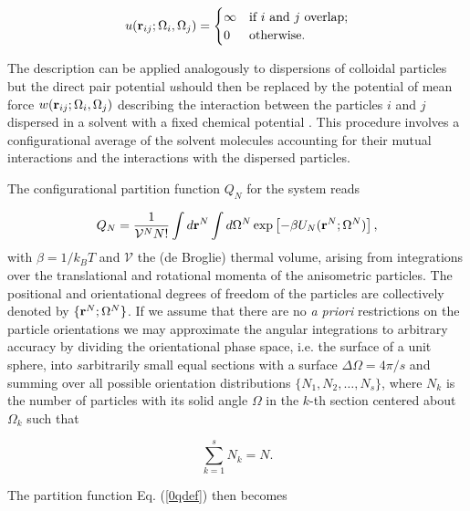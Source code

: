 {\begin{equation}
u({\bf r}_{ij}; \Omega_{i}, \Omega_{j}) =
\begin{cases}
\infty  &\text{if $i$ and $j$ overlap;} \\
0 &\text{otherwise.} \label{0pairpot}
\end{cases}
\end{equation}

The  description can be applied analogously to dispersions of colloidal particles but the direct pair potential $u$should then be replaced by the potential of mean force $w({\bf r}_{ij};\Omega_{i},\Omega_{j})$ describing the interaction between the  particles $i$ and $j$dispersed in a  solvent with a fixed chemical potential \cite{macmillan,Hill}. This procedure involves a configurational average of the solvent molecules accounting for their mutual interactions and the interactions with the dispersed particles.

The configurational partition function $Q_{N}$ for the system reads

\begin{equation}
Q_{N}=\frac{1}{\mathcal{V} ^{N} N!}\int d{\bf r}^{N}\int d\Omega ^{N}\exp\left[-\beta U_{N}({\bf r}^{N}; \Omega^{N})\right],
\label{0qdef}
\end{equation}
with $\beta= 1/k_{B}T$ and $\mathcal{V}$ the (de Broglie) thermal volume, arising from integrations over the translational and rotational momenta of the anisometric particles. The positional and orientational degrees of freedom of the particles are collectively denoted by $\{{\bf r}^{N};\Omega^{N}\}$. If we assume that there are no  {\em a priori} restrictions on the particle orientations we may approximate the  angular integrations  to arbitrary accuracy by dividing the orientational phase space, i.e. the surface of a unit sphere, into $s$arbitrarily small equal sections  with a surface $\Delta \Omega = 4\pi/s$ and summing over all possible orientation distributions $\{N_{1},N_{2}, \ldots, N_{s}\}$, where $N_{k}$ is the number of particles with its solid angle $\Omega$ in the $k$-th section centered about
$\Omega_{k}$ such that

\begin{equation}
\sum _{k=1}^{s} N_{k} =N. \label{0behoud}
\end{equation}

The partition function Eq. (\ref{0qdef}) then becomes

}
